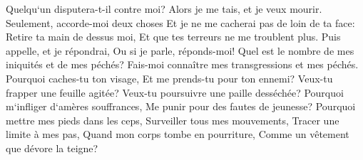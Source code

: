 \verse Quelqu`un disputera-t-il contre moi? Alors je me tais, et je veux mourir. 
\verse Seulement, accorde-moi deux choses Et je ne me cacherai pas de loin de ta face: 
\verse Retire ta main de dessus moi, Et que tes terreurs ne me troublent plus. 
\verse Puis appelle, et je répondrai, Ou si je parle, réponds-moi! 
\verse Quel est le nombre de mes iniquités et de mes péchés? Fais-moi connaître mes transgressions et mes péchés. 
\verse Pourquoi caches-tu ton visage, Et me prends-tu pour ton ennemi? 
\verse Veux-tu frapper une feuille agitée? Veux-tu poursuivre une paille desséchée? 
\verse Pourquoi m`infliger d`amères souffrances, Me punir pour des fautes de jeunesse? 
\verse Pourquoi mettre mes pieds dans les ceps, Surveiller tous mes mouvements, Tracer une limite à mes pas, 
\verse Quand mon corps tombe en pourriture, Comme un vêtement que dévore la teigne? 

